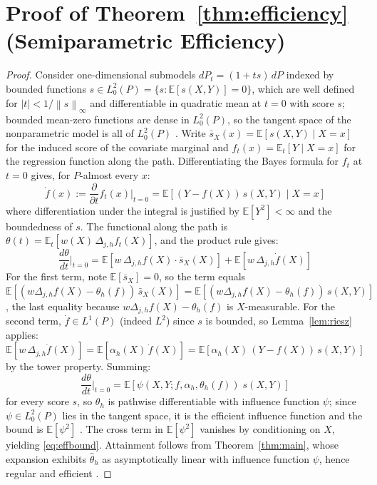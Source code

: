 \documentclass[12pt]{article}
\newcommand{\norm}[1]{\left\| #1 \right\|}
\newcommand{\E}{\mathbb{E}}
\newcommand{\abs}[1]{\left| #1 \right|}
\newcommand{\Dh}{\Delta_{j,h}}
\begin{document}
	\section{Proof of Theorem~\ref{thm:efficiency} (Semiparametric Efficiency)}
	\label{app:thm_eff}
	
	\begin{proof}
		Consider one-dimensional submodels
		$dP_t = (1 + t s)\, dP$ indexed by bounded functions
		$s \in L^2_0(P) = \{s : \E[s(X, Y)] = 0\}$, which are well defined for
		$\abs{t} < 1/\norm{s}_\infty$ and differentiable in quadratic mean at $t = 0$
		with score $s$; bounded mean-zero functions are dense in $L^2_0(P)$, so the
		tangent space of the nonparametric model is all of $L^2_0(P)$
		\citep[Chapter~25]{vaart1998}. Write
		$\bar{s}_X(x) = \E[s(X, Y) \mid X = x]$ for the induced score of the
		covariate marginal and
		$f_t(x) = \E_t[Y \mid X = x]$ for the regression function along the path.
		Differentiating the Bayes formula for $f_t$ at $t = 0$ gives, for
		$P$-almost every $x$:
		\begin{equation}
			\dot{f}(x) := \frac{\partial}{\partial t} f_t(x)\Big|_{t=0}
			= \E\left[(Y - f(X))\, s(X, Y) \mid X = x\right]
		\end{equation}
		where differentiation under the integral is justified by
		$\E[Y^2] < \infty$ and the boundedness of $s$. The functional along the path
		is $\theta(t) = \E_t[w(X)\, \Dh f_t(X)]$, and the product rule gives:
		\begin{equation}
			\frac{d\theta}{dt}\Big|_{t=0}
			= \E\left[w\, \Dh f(X)\cdot \bar{s}_X(X)\right]
			+ \E\left[w\, \Dh \dot{f}(X)\right]
		\end{equation}
		For the first term, note $\E[\bar{s}_X] = 0$, so the term equals
		$\E[(w \Dh f(X) - \theta_h(f))\, \bar{s}_X(X)]
		= \E[(w \Dh f(X) - \theta_h(f))\, s(X, Y)]$, the last equality because
		$w \Dh f(X) - \theta_h(f)$ is $X$-measurable. For the second term,
		$\dot{f} \in L^1(P)$ (indeed $L^2$) since $s$ is bounded, so
		Lemma~\ref{lem:riesz} applies:
		\begin{equation}
			\E\left[w\, \Dh \dot{f}(X)\right]
			= \E\left[\alpha_h(X)\, \dot{f}(X)\right]
			= \E\left[\alpha_h(X)\,(Y - f(X))\, s(X, Y)\right]
		\end{equation}
		by the tower property. Summing:
		\begin{equation}
			\frac{d\theta}{dt}\Big|_{t=0}
			= \E\left[\psi(X, Y; f, \alpha_h, \theta_h(f))\; s(X, Y)\right]
		\end{equation}
		for every score $s$, so $\theta_h$ is pathwise differentiable with influence
		function $\psi$; since $\psi \in L^2_0(P)$ lies in the tangent space, it is
		the efficient influence function and the bound is
		$\E[\psi^2]$ \citep[Theorem~25.20]{vaart1998}. The cross term in
		$\E[\psi^2]$ vanishes by conditioning on $X$, yielding
		\eqref{eq:effbound}. Attainment follows from Theorem~\ref{thm:main}, whose
		expansion exhibits $\hat{\theta}_h$ as asymptotically linear with influence
		function $\psi$, hence regular and efficient
		\citep[Lemma~25.23]{vaart1998}.
	\end{proof}
	
\end{document}

